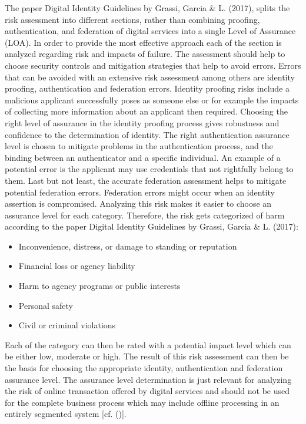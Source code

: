 The paper Digital Identity Guidelines by Grassi, Garcia \& L. (2017), splits the risk assessment into different sections, rather than combining proofing, authentication, and federation of digital services into a single Level of Assurance (LOA). In order to provide the most effective approach each of the section is analyzed regarding risk and impacts of failure. The assessment should help to choose security controls and mitigation strategies that help to avoid errors. Errors that can be avoided with an extensive risk assessment among others are identity proofing, authentication and federation errors. Identity proofing risks include a malicious applicant successfully poses as someone else or for example the impacts of collecting more information about an applicant then required. Choosing the right level of assurance in the identity proofing process gives robustness and confidence to the determination of identity. The right authentication assurance level is chosen to mitigate problems in the authentication process, and the binding between an authenticator and a specific individual. An example of a potential error is the applicant may use credentials that not rightfully belong to them. Last but not least, the accurate federation assessment helps to mitigate potential federation errors. Federation errors might occur when an identity assertion is compromised. Analyzing this risk makes it easier to choose an assurance level for each category. Therefore, the risk gets categorized of harm according to the paper Digital Identity Guidelines by Grassi, Garcia \& L. (2017): 

\begin{itemize}
	\item Inconvenience, distress, or damage to standing or reputation
	\item Financial loss or agency liability
	\item Harm to agency programs or public interests
	\item Personal safety
	\item Civil or criminal violations
\end{itemize}

Each of the category can then be rated with a potential impact level which can be either low, moderate or high. The result of this risk assessment can then be the basis for choosing the appropriate identity, authentication and federation assurance level. The assurance level determination is just relevant for analyzing the risk of online transaction offered by digital services and should not be used for the complete business process which may include offline processing in an entirely segmented system [cf. (\cite{NIST:2017:DIG})]. 

